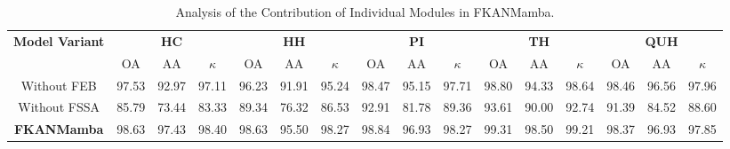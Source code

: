 \begin{table}[h]
\caption{Analysis of the Contribution of Individual Modules in FKANMamba.}
\centering
\begin{adjustbox}{max width=\linewidth}
\begin{tabular}{|c|ccc|ccc|ccc|ccc|ccc|}
\hline
\multirow{2}{*}{\textbf{Model Variant}}
& \multicolumn{3}{c|}{\textbf{HC}} & \multicolumn{3}{c|}{\textbf{HH}} & \multicolumn{3}{c|}{\textbf{PI}} & \multicolumn{3}{c|}{\textbf{TH}} & \multicolumn{3}{c|}{\textbf{QUH}} \\
\cline{2-16} 
& OA & AA & $\kappa$ & OA & AA & $\kappa$ & OA & AA & $\kappa$ & OA & AA & $\kappa$ & OA & AA & $\kappa$ \\
\hline
Without FEB
& 97.53 & 92.97 & 97.11 & 96.23 & 91.91 & 95.24 & 98.47 & 95.15 & 97.71 & 98.80 & 94.33 & 98.64 & 98.46 & 96.56 & 97.96 \\
\hline

Without FSSA
& 85.79 & 73.44 & 83.33 & 89.34 & 76.32 & 86.53 & 92.91 & 81.78 & 89.36 & 93.61 & 90.00 & 92.74 & 91.39 & 84.52 & 88.60 \\
\hline

\textbf{FKANMamba}
& 98.63 & 97.43 & 98.40 & 98.63 & 95.50 & 98.27 & 98.84 & 96.93 & 98.27 & 99.31 & 98.50 & 99.21 & 98.37 & 96.93 & 97.85 \\
\hline
\end{tabular}
\end{adjustbox}
\label{tab:feb_fssa}
\end{table}


